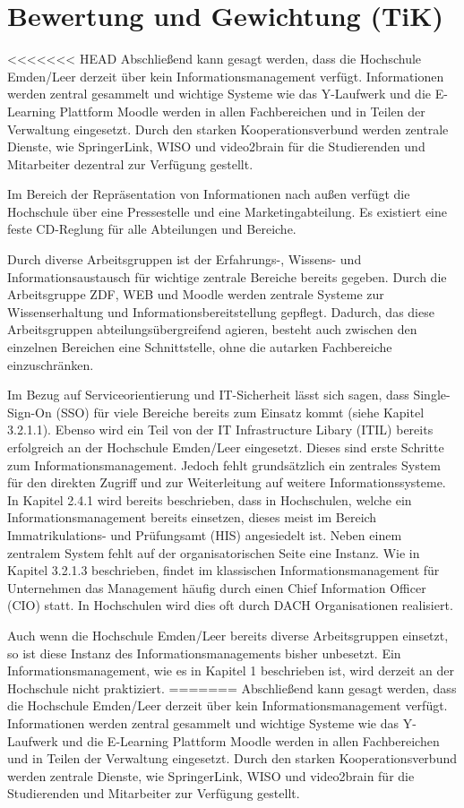 \section{Bewertung und Gewichtung (TiK)}
<<<<<<< HEAD
Abschließend kann gesagt werden, dass die Hochschule Emden/Leer derzeit über kein Informationsmanagement verfügt. Informationen werden zentral gesammelt und wichtige Systeme wie das Y-Laufwerk und die E-Learning Plattform Moodle werden in allen Fachbereichen und in Teilen der Verwaltung eingesetzt. Durch den starken Kooperationsverbund werden zentrale Dienste, wie SpringerLink, WISO und video2brain für die Studierenden und Mitarbeiter dezentral zur Verfügung gestellt. 

Im Bereich der Repräsentation von Informationen nach außen verfügt die Hochschule über eine Pressestelle und eine Marketingabteilung. Es existiert eine feste CD-Reglung für alle Abteilungen und Bereiche. 

Durch diverse Arbeitsgruppen ist der Erfahrungs-, Wissens- und Informationsaustausch für wichtige zentrale Bereiche bereits gegeben. Durch die Arbeitsgruppe ZDF, WEB und Moodle werden zentrale Systeme zur Wissenserhaltung und Informationsbereitstellung gepflegt. Dadurch, das diese Arbeitsgruppen abteilungsübergreifend agieren, besteht auch zwischen den einzelnen Bereichen eine Schnittstelle, ohne die autarken Fachbereiche einzuschränken. 

Im Bezug auf Serviceorientierung und IT-Sicherheit lässt sich sagen, dass Single-Sign-On (SSO) für viele Bereiche bereits zum Einsatz kommt (siehe Kapitel 3.2.1.1). Ebenso wird ein Teil von der IT Infrastructure Libary (ITIL) bereits erfolgreich an der Hochschule Emden/Leer eingesetzt. Dieses sind erste Schritte zum Informationsmanagement. Jedoch fehlt grundsätzlich ein zentrales System für den direkten Zugriff und zur Weiterleitung auf weitere Informationssysteme. In Kapitel 2.4.1 wird bereits beschrieben, dass in Hochschulen, welche ein Informationsmanagement bereits einsetzen, dieses meist im Bereich Immatrikulations- und Prüfungsamt (HIS) angesiedelt ist. 
Neben einem  zentralem System fehlt auf der organisatorischen Seite eine Instanz. Wie in Kapitel 3.2.1.3 beschrieben, findet im klassischen Informationsmanagement für Unternehmen das Management häufig durch einen Chief Information Officer (CIO) statt. In Hochschulen wird dies oft durch DACH Organisationen realisiert. 

Auch wenn die Hochschule Emden/Leer bereits diverse Arbeitsgruppen einsetzt, so ist diese Instanz des Informationsmanagements bisher unbesetzt. Ein Informationsmanagement, wie es in Kapitel 1 beschrieben ist, wird derzeit an der Hochschule nicht praktiziert.
=======
Abschließend kann gesagt werden, dass die Hochschule Emden/Leer derzeit über kein Informationsmanagement verfügt. Informationen werden zentral gesammelt und wichtige Systeme wie das Y-Laufwerk und die E-Learning Plattform Moodle werden in allen Fachbereichen und in Teilen der Verwaltung eingesetzt. Durch den starken Kooperationsverbund werden zentrale Dienste, wie SpringerLink, WISO und video2brain für die Studierenden und Mitarbeiter zur Verfügung gestellt. 

